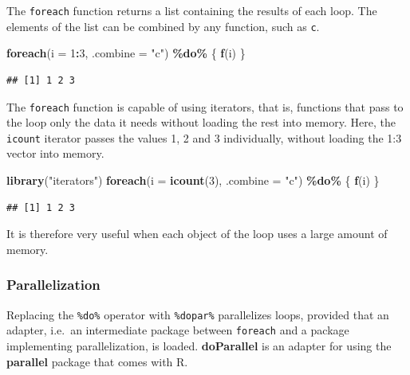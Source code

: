 \documentclass[
  12pt,
  american,
  a4paper,
  extrafontsizes,onecolumn,openright
  ]{memoir}
\newenvironment{Shaded}{\begin{snugshade}}{\end{snugshade}}
\newcommand{\AttributeTok}[1]{\textcolor[rgb]{0.13,0.29,0.53}{#1}}
\newcommand{\DecValTok}[1]{\textcolor[rgb]{0.00,0.00,0.81}{#1}}
\newcommand{\FunctionTok}[1]{\textcolor[rgb]{0.13,0.29,0.53}{\textbf{#1}}}
\newcommand{\NormalTok}[1]{#1}
\newcommand{\SpecialCharTok}[1]{\textcolor[rgb]{0.81,0.36,0.00}{\textbf{#1}}}
\newcommand{\StringTok}[1]{\textcolor[rgb]{0.31,0.60,0.02}{#1}}
\begin{document}
The \texttt{foreach} function returns a list containing the results of each loop.
The elements of the list can be combined by any function, such as \texttt{c}.

\scriptsize

\begin{Shaded}
\begin{Highlighting}[]
\FunctionTok{foreach}\NormalTok{(}\AttributeTok{i =} \DecValTok{1}\SpecialCharTok{:}\DecValTok{3}\NormalTok{, }\AttributeTok{.combine =} \StringTok{"c"}\NormalTok{) }\SpecialCharTok{\%do\%}\NormalTok{ \{}
    \FunctionTok{f}\NormalTok{(i)}
\NormalTok{\}}
\end{Highlighting}
\end{Shaded}

\begin{verbatim}
## [1] 1 2 3
\end{verbatim}

\normalsize

The \texttt{foreach} function is capable of using iterators, that is, functions that pass to the loop only the data it needs without loading the rest into memory.
Here, the \texttt{icount} iterator passes the values 1, 2 and 3 individually, without loading the 1:3 vector into memory.

\scriptsize

\begin{Shaded}
\begin{Highlighting}[]
\FunctionTok{library}\NormalTok{(}\StringTok{"iterators"}\NormalTok{)}
\FunctionTok{foreach}\NormalTok{(}\AttributeTok{i =} \FunctionTok{icount}\NormalTok{(}\DecValTok{3}\NormalTok{), }\AttributeTok{.combine =} \StringTok{"c"}\NormalTok{) }\SpecialCharTok{\%do\%}\NormalTok{ \{}
    \FunctionTok{f}\NormalTok{(i)}
\NormalTok{\}}
\end{Highlighting}
\end{Shaded}

\begin{verbatim}
## [1] 1 2 3
\end{verbatim}

\normalsize

It is therefore very useful when each object of the loop uses a large amount of memory.

\subsubsection{Parallelization}\label{parallelization}

Replacing the \texttt{\%do\%} operator with \texttt{\%dopar\%} parallelizes loops, provided that an adapter, i.e.~an intermediate package between \texttt{foreach} and a package implementing parallelization, is loaded.
\textbf{doParallel} is an adapter for using the \textbf{parallel} package that comes with R.
\end{document}

